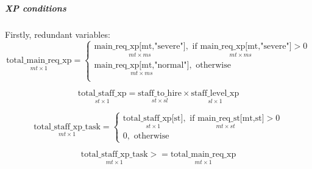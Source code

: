         \subparagraph{XP conditions} \label{xp condition} \text{} \newline
        \hspace*{.5cm}Firstly, redundant variables:
        \begin{equation}
            \underset{mt\times 1}{\mathrm{\text{total\_main\_req\_xp}}} = 
            \begin{cases}
                \underset{mt\times ms}{\text{main\_req\_xp[mt,"severe"]}}, \underset{mt\times ms}{\text{ if } \text{main\_req\_xp[mt,"severe"]}} > 0\\[3ex]
                \underset{mt\times ms}{\text{main\_req\_xp[mt,"normal"]}}, \text{ otherwise}\\
            \end{cases}
        \end{equation}

        \begin{equation}
            \underset{st\times 1}{\text{total\_staff\_xp}} =  
                \underset{st\times sl}{\text{staff\_to\_hire}}\times \underset{sl\times 1}{\text{staff\_level\_xp}}
        \end{equation}

        \begin{equation}
            \underset{mt\times 1}{\text{total\_staff\_xp\_task}} =
            \begin{cases}
                \underset{st\times 1}{\text{total\_staff\_xp[st]}}, \underset{mt\times st}{\text{ if } \text{main\_req\_st[mt,st]}} > 0\\[3ex]
                0, \text{ otherwise}
            \end{cases}
        \end{equation} \newline

        \begin{equation}
            \underset{mt\times 1}{\text{total\_staff\_xp\_task}} >=  
                \underset{mt\times 1}{\text{total\_main\_req\_xp}}
        \end{equation}

